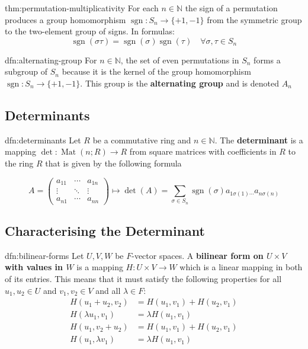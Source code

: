 \documentclass[landscape, 8pt]{extarticle}
\DeclareMathOperator{\sgn}{sgn}
\DeclareMathOperator{\Mat}{Mat}
\begin{document}
\begin{multicols}{3}
\begin{thm}{thm:permutation-multiplicativity}{}
    For each $n\in \mathbb{N}$ the sign of a permutation produces a group homomorphism $\sgn : S_{n} \to \{+1, -1\}$ from the symmetric group to the two-element group of signs. In formulas:
    \[\sgn(\sigma\tau) = \sgn(\sigma)\sgn(\tau) \quad \forall \sigma, \tau\in S_{n}\]
\end{thm}

\begin{dfn}{dfn:alternating-group}{}
    For $n\in \mathbb{N}$, the set of even permutations in $S_{n}$ forms a subgroup of $S_{n}$ because it is the kernel of the group homomorphism $\sgn : S_{n}\to \{+1, -1\}$. This group is the \textbf{alternating group} and is denoted $A_{n}$
\end{dfn}

\subsection{Determinants}

\begin{dfn}[Determinants]{dfn:determinants}{}
    Let $R$ be a commutative ring and $n\in \mathbb{N}$. The \textbf{determinant} is a mapping $\det : \Mat(n;R) \to R$ from square matrices with coefficients in $R$ to the ring $R$ that is given by the following formula

    \[A = \begin{pmatrix}
        a_{11} & \cdots & a_{1n}\\
        \vdots & \ddots & \vdots\\
        a_{n1} & \cdots & a_{nn}
    \end{pmatrix} \mapsto \det(A) = \sum_{\sigma\in S_{n}} \sgn(\sigma) a_{1\sigma(1)\cdots}  a_{n\sigma(n)}\]
\end{dfn}

\subsection{Characterising the Determinant}

\begin{dfn}{dfn:bilinear-forms}{}
    Let $U,V,W$ be $F$-vector spaces. A \textbf{bilinear form on $U \times V$ with values in $W$} is a mapping $H: U \times V \to W $ which is a linear mapping in both of its entries. This means that it must satisfy the following properties for all $u_{1}, u_{2}\in U$ and $v_{1}, v_{2}\in V$ and all $\lambda\in F$:
    \begin{align*}
        H(u_{1} + u_{2}, v_{2}) &= H(u_{1}, v_{1}) + H(u_{2}, v_{1})\\
        H(\lambda u_{1}, v_{1}) &= \lambda H(u_{1}, v_{1}) \\
        H(u_{1}, v_{2} + u_{2}) &= H(u_{1}, v_{1}) + H(u_{2}, v_{1})\\
        H(u_{1},\lambda v_{1}) &= \lambda H(u_{1}, v_{1}) \\
    \end{align*}
\end{dfn}


\end{multicols}
\end{document}

